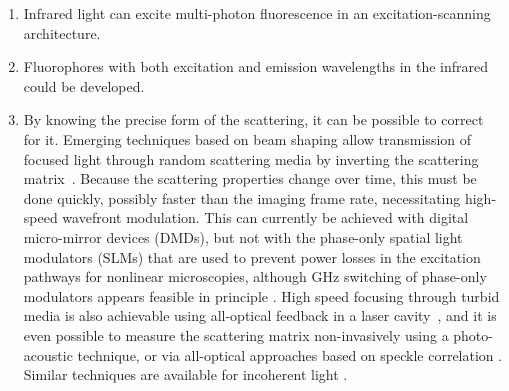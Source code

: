 \begin{enumerate}
\item Infrared light can excite multi-photon fluorescence in an excitation-scanning architecture.
\item Fluorophores with both excitation and emission wavelengths in the infrared could be developed.
\item By knowing the precise form of the scattering, it can be possible to correct for it. Emerging techniques based on beam shaping allow transmission of focused light through random scattering media by inverting the scattering matrix~\cite{conkey12}.
Because the scattering properties change over time, this must be done quickly, possibly faster than the imaging frame rate, necessitating high-speed wavefront modulation. This can currently be achieved with digital micro-mirror devices (DMDs), but not with the phase-only spatial light modulators (SLMs) that are used to prevent power losses in the excitation pathways for nonlinear microscopies, although GHz switching of phase-only modulators appears feasible in principle \cite{alivisatos13}. High speed focusing through turbid media is also achievable using all-optical feedback in a laser cavity~\cite{Nixon2013}, and it is even possible to measure the scattering matrix non-invasively \cite{Chaigne2013} using a photo-acoustic technique, or via all-optical approaches based on speckle correlation \cite{bertolotti2012non}. Similar techniques are available for incoherent light \cite{katz2012looking}.


\end{enumerate}
